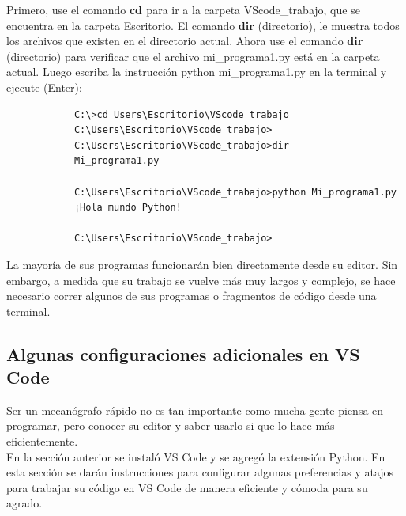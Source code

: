 Primero, use el comando {\bf {cd }} para ir a la carpeta {\ttfamily VScode\_trabajo}, que se encuentra en la carpeta {\ttfamily Escritorio}. El comando {\bf {dir}} (directorio), le muestra todos los archivos que existen en el directorio actual. Ahora  use el comando {\bf {dir}} (directorio) para verificar que el archivo {\ttfamily  mi\_programa1.py} está en la carpeta actual. Luego escriba la instrucción\label{pagi11}  {\ttfamily python  mi\_programa1.py}  en la terminal y ejecute (Enter):
{\ttfamily\scriptsize\scriptsize 
	\hspace{-0.65cm}\vspace{-0.1cm}	
	{\color{black} 	
		\begin{verbatim}
			C:\>cd Users\Escritorio\VScode_trabajo
			C:\Users\Escritorio\VScode_trabajo>
			C:\Users\Escritorio\VScode_trabajo>dir
			Mi_programa1.py
			
			C:\Users\Escritorio\VScode_trabajo>python Mi_programa1.py
			¡Hola mundo Python!
			
			C:\Users\Escritorio\VScode_trabajo>
		\end{verbatim}
}}


La mayoría de sus programas funcionarán bien directamente desde su editor. Sin embargo, a medida que su trabajo se vuelve más muy largos y  complejo, se hace necesario correr algunos de sus programas o fragmentos de código desde una terminal.   



\subsection{Algunas configuraciones adicionales en VS Code}

Ser un mecanógrafo rápido no es tan importante como mucha gente piensa en
programar, pero conocer su editor y saber usarlo si que lo hace más eficientemente.\\

En la sección anterior se instaló VS Code y se agregó la extensión Python. En esta sección se darán instrucciones 
para configurar algunas preferencias  y atajos para trabajar su código en VS Code de  manera  eficiente y cómoda para su agrado.\\


